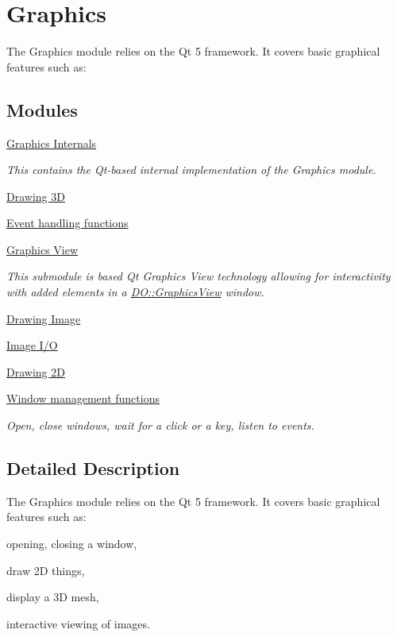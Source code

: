 \hypertarget{group___graphics}{\section{Graphics}
\label{group___graphics}
}


The Graphics module relies on the Qt 5 framework. It covers basic graphical features such as\-:  


\subsection*{Modules}
\begin{DoxyCompactItemize}
\item 
\hyperlink{group___graphics_internal}{Graphics Internals}
\begin{DoxyCompactList}\small\item\em This contains the Qt-\/based internal implementation of the Graphics module. \end{DoxyCompactList}\item 
\hyperlink{group___draw3_d}{Drawing 3\-D}
\item 
\hyperlink{group___event}{Event handling functions}
\item 
\hyperlink{group___graphics_view}{Graphics View}
\begin{DoxyCompactList}\small\item\em This submodule is based Qt Graphics View technology allowing for interactivity with added elements in a \hyperlink{class_d_o_1_1_graphics_view}{D\-O\-::\-Graphics\-View} window. \end{DoxyCompactList}\item 
\hyperlink{group___image_drawing}{Drawing Image}
\item 
\hyperlink{group___image_i_o}{Image I/\-O}
\item 
\hyperlink{group___draw2_d}{Drawing 2\-D}
\item 
\hyperlink{group___window_management}{Window management functions}
\begin{DoxyCompactList}\small\item\em Open, close windows, wait for a click or a key, listen to events. \end{DoxyCompactList}\end{DoxyCompactItemize}


\subsection{Detailed Description}
The Graphics module relies on the Qt 5 framework. It covers basic graphical features such as\-: 
\begin{DoxyItemize}
\item opening, closing a window,
\item draw 2\-D things,
\item display a 3\-D mesh,
\item interactive viewing of images. 
\end{DoxyItemize}